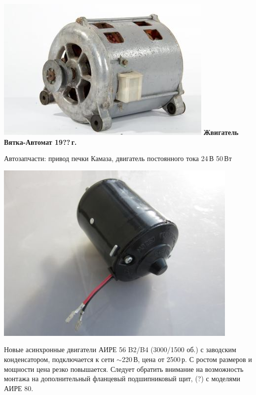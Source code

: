 \documentclass{magazine}
\begin{document}
{\noindent\includegraphics[width=\columnwidth]{fig/00/VyatkaDvig.jpg}
\textbf{Жвигатель Вятка-Автомат 19??\,г.}
  
\bigskip
Автозапчасти: привод печки Камаза, двигатель постоянного тока 24\,В
  50\,Вт
  
\noindent\includegraphics[width=\columnwidth]{fig/00/KamazDvig.jpg}
  
\bigskip
Новые асинхронные двигатели АИРЕ 56 B2/B4 (3000/1500 об.)
с заводским конденсатором, подключается к сети $\sim$220\,В, цена от 2500\,р.
С ростом размеров и мощности цена резко повышается.
Следует обратить внимание на возможность монтажа на дополнительный фланцевый
подшипниковый щит, (?) с моделями АИРЕ 80.

}
\end{document}
